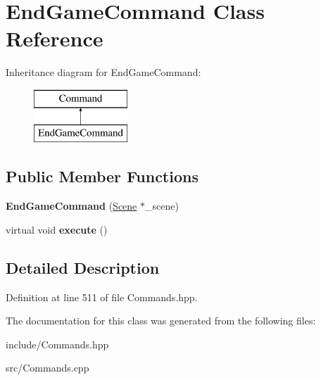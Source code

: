 \hypertarget{class_end_game_command}{}\section{End\+Game\+Command Class Reference}
\label{class_end_game_command}
Inheritance diagram for End\+Game\+Command\+:\begin{figure}[H]
\begin{center}
\leavevmode
\includegraphics[height=2.000000cm]{class_end_game_command}
\end{center}
\end{figure}
\subsection*{Public Member Functions}
\begin{DoxyCompactItemize}
\item 
\hypertarget{class_end_game_command_a3af9dd70005af40116ed57b99e824dc0}{}{\bfseries End\+Game\+Command} (\hyperlink{class_scene}{Scene} $\ast$\+\_\+scene)\label{class_end_game_command_a3af9dd70005af40116ed57b99e824dc0}

\item 
\hypertarget{class_end_game_command_acb07a306314ce1c0c38d3807d1d459e3}{}virtual void {\bfseries execute} ()\label{class_end_game_command_acb07a306314ce1c0c38d3807d1d459e3}

\end{DoxyCompactItemize}


\subsection{Detailed Description}


Definition at line 511 of file Commands.\+hpp.



The documentation for this class was generated from the following files\+:\begin{DoxyCompactItemize}
\item 
include/Commands.\+hpp\item 
src/Commands.\+cpp\end{DoxyCompactItemize}
